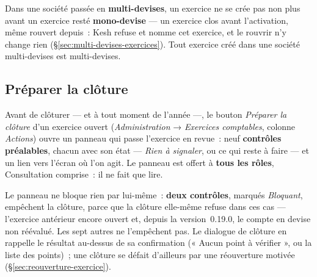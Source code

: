 \documentclass[a4paper,11pt,oneside]{article}
\begin{document}
Dans une société passée en \textbf{multi-devises}, un exercice ne se crée pas non plus avant un exercice resté \textbf{mono-devise} --- un exercice clos avant l'activation, même rouvert depuis~: Kesh refuse et nomme cet exercice, et le rouvrir n'y change rien (\S\ref{sec:multi-devises-exercices}). Tout exercice créé dans une société multi-devises est multi-devises.

\subsection{Préparer la clôture}\label{sec:preparer-cloture}

Avant de clôturer --- et à tout moment de l'année ---, le bouton \emph{Préparer la clôture} d'un exercice ouvert (\emph{Administration} → \emph{Exercices comptables}, colonne \emph{Actions}) ouvre un panneau qui passe l'exercice en revue~: neuf \textbf{contrôles préalables}, chacun avec son état --- \emph{Rien à signaler}, ou ce qui reste à faire --- et un lien vers l'écran où l'on agit. Le panneau est offert à \textbf{tous les rôles}, Consultation comprise~: il ne fait que lire.

Le panneau ne bloque rien par lui-même~: \textbf{deux contrôles}, marqués \emph{Bloquant}, empêchent la clôture, parce que la clôture elle-même refuse dans ces cas --- l'exercice antérieur encore ouvert et, depuis la version~0.19.0, le compte en devise non réévalué. Les sept autres ne l'empêchent pas. Le dialogue de clôture en rappelle le résultat au-dessus de sa confirmation (« Aucun point à vérifier », ou la liste des points)~; une clôture se défait d'ailleurs par une réouverture motivée (\S\ref{sec:reouverture-exercice}).
\end{document}
